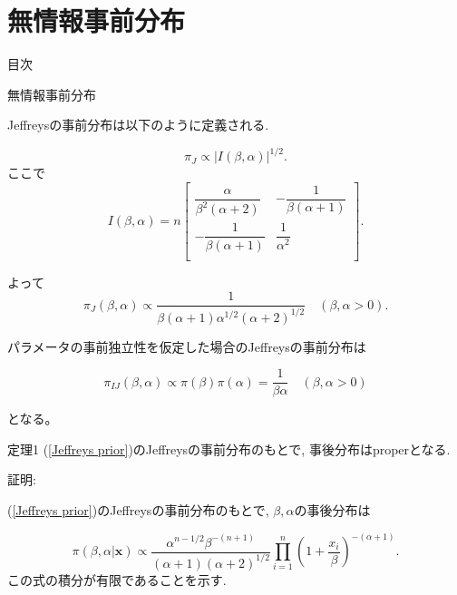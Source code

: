 \documentclass[12pt,dvipdfmx]{beamer}
\begin{document}
\section{無情報事前分布}


\begin{frame}
{\large 目次}
\tableofcontents[currentsection]
\end{frame}

\begin{frame}{無情報事前分布}

Jeffreysの事前分布は以下のように定義される. 

$$
\pi_{J}
\propto
|I(\beta ,\alpha )|^{1/2}.
$$
ここで
$$
I(\beta ,\alpha ) = n
\begin{bmatrix}
\dfrac{\alpha}{\beta ^{2}(\alpha +2)} & -\dfrac{1}{\beta (\alpha +1)}\\
-\dfrac{1}{\beta (\alpha +1)} & \dfrac{1}{\alpha ^{2}} \\
\end{bmatrix}.
$$

よって
\begin{equation}\label{Jeffreys prior}
\pi_{J}(\beta ,\alpha )
\propto
\frac{1}{\beta (\alpha +1)\alpha ^{1/2}(\alpha +2)^{1/2}}\quad (\beta ,\alpha >0).
\end{equation}


\end{frame}


\begin{frame}


パラメータの事前独立性を仮定した場合のJeffreysの事前分布は

\begin{equation}\label{independent prior}
\pi_{IJ}(\beta ,\alpha )
\propto 
\pi (\beta )\pi (\alpha )
=
\frac{1}{\beta \alpha }\quad (\beta,\alpha >0)
\end{equation}

となる。

\end{frame}




\begin{frame}


\begin{block}{定理1}
(\ref{Jeffreys prior})のJeffreysの事前分布のもとで, 事後分布はproperとなる.
\end{block}

証明:

(\ref{Jeffreys prior})のJeffreysの事前分布のもとで, $\beta ,\alpha $の事後分布は

$$
\pi(\beta ,\alpha |\bm{x})
\propto
\frac{\alpha^{n-1/2}\beta ^{-(n+1)}}{(\alpha +1)(\alpha +2)^{1/2}}
\prod_{i=1}^{n}
\left(1+\frac{x_{i}}{\beta }
\right)^{-(\alpha +1)}. 
$$
この式の積分が有限であることを示す. 
\end{frame}
\end{document}
